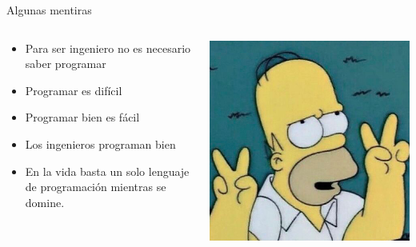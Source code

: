 \documentclass{bredelebeamer}
\begin{document}
\begin{frame}{Algunas mentiras}
\begin{columns}
\begin{column}{0.5\textwidth}
\begin{itemize}
\item Para ser ingeniero no es necesario saber programar
\item Programar es difícil
\item Programar bien es fácil
\item Los ingenieros programan bien
\item En la vida basta un solo lenguaje de programación mientras se domine.
\end{itemize}
\end{column}
\begin{column}{0.23\textwidth}
\begin{center}
\includegraphics[scale=0.18]{images/img43.png}
\end{center}
\end{column}
\end{columns}
\end{frame}



\end{document}

